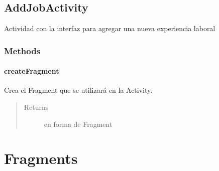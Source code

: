 \documentclass[letterpaper,10pt,english]{sphinxmanual}
\begin{document}
\section{AddJobActivity}
\label{Activities/AddJobActivity:addjobactivity}\label{Activities/AddJobActivity::doc}

\begin{fulllineitems}
\label{Activities/AddJobActivity:AddJobActivity}
Actividad con la interfaz para agregar una nueva experiencia laboral

\end{fulllineitems}



\subsection{Methods}
\label{Activities/AddJobActivity:methods}

\subsubsection{createFragment}
\label{Activities/AddJobActivity:createfragment}

\begin{fulllineitems}
\label{Activities/AddJobActivity:AddJobActivity.createFragment()}
Crea el Fragment que se utilizará en la Activity.
\begin{quote}\begin{description}
\item[{Returns}] \leavevmode
{} en forma de Fragment

\end{description}\end{quote}

\end{fulllineitems}



\chapter{Fragments}
\label{Fragments/package-index:fragments}\label{Fragments/package-index::doc}
\end{document}
